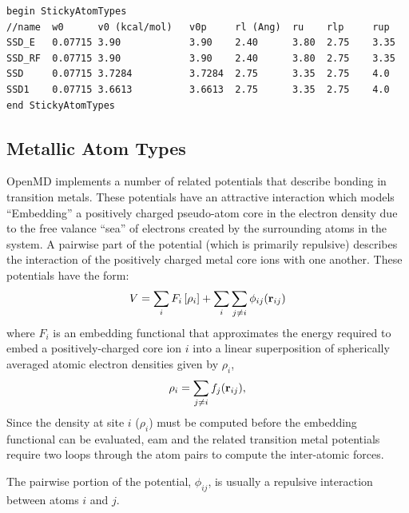\documentclass[]{book}
\begin{document}
\begin{lstlisting}[caption={[An example of a StickyAtomTypes block.] A
simple example of a StickyAtomTypes block.  Distances ($r_l$, $r_u$,
$r_{l}'$ and $r_{u}'$) are given in \AA\ and energies ($v_0, v_{0}'$)
are in units of kcal/mol. $w_0$ is unitless.},
label={sch:StickyAtomTypes}]
begin StickyAtomTypes
//name  w0      v0 (kcal/mol)   v0p     rl (Ang)  ru    rlp     rup
SSD_E   0.07715 3.90            3.90    2.40      3.80  2.75    3.35
SSD_RF  0.07715 3.90            3.90    2.40      3.80  2.75    3.35
SSD     0.07715 3.7284          3.7284  2.75      3.35  2.75    4.0
SSD1    0.07715 3.6613          3.6613  2.75      3.35  2.75    4.0
end StickyAtomTypes
\end{lstlisting}

\subsection{\label{section::ffMetals}Metallic Atom Types} 

{\sc OpenMD} implements a number of related potentials that describe
bonding in transition metals. These potentials have an attractive
interaction which models ``Embedding'' a positively charged
pseudo-atom core in the electron density due to the free valance
``sea'' of electrons created by the surrounding atoms in the system.
A pairwise part of the potential (which is primarily repulsive)
describes the interaction of the positively charged metal core ions
with one another.  These potentials have the form:
\begin{equation}
V  =  \sum_{i} F_{i}\left[\rho_{i}\right] + \sum_{i} \sum_{j \neq i}
\phi_{ij}({\bf r}_{ij})
\end{equation}
where $F_{i} $ is an embedding functional that approximates the energy
required to embed a positively-charged core ion $i$ into a linear
superposition of spherically averaged atomic electron densities given
by $\rho_{i}$,
\begin{equation}
\rho_{i}   =  \sum_{j \neq i} f_{j}({\bf r}_{ij}),
\end{equation}
Since the density at site $i$ ($\rho_i$) must be computed before the
embedding functional can be evaluated, {\sc eam} and the related
transition metal potentials require two loops through the atom pairs
to compute the inter-atomic forces.

The pairwise portion of the potential, $\phi_{ij}$, is usually a
repulsive interaction between atoms $i$ and $j$.
\end{document}

